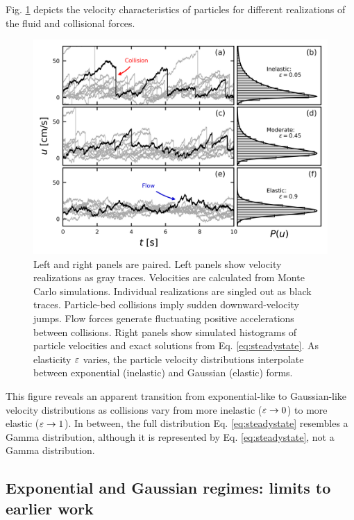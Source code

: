 Fig. \ref{fig:fig2} depicts the velocity characteristics of particles for different realizations of the fluid and collisional forces.
\begin{figure}
	\centerline{\includegraphics{./figures/ch5/Fig2pdfs.png}}
	\caption{Left and right panels are paired. Left panels show velocity realizations as gray traces. Velocities are calculated from Monte Carlo simulations. Individual realizations are singled out as black traces. Particle-bed collisions imply sudden downward-velocity jumps. Flow forces generate fluctuating positive accelerations between collisions. Right panels show simulated histograms of particle velocities and exact solutions from Eq. \ref{eq:steadystate}. As elasticity $\varepsilon$ varies, the particle velocity distributions interpolate between exponential (inelastic) and Gaussian (elastic) forms.}
	\label{fig:fig2}
\end{figure}
This figure reveals an apparent transition from exponential-like to Gaussian-like velocity distributions as collisions vary from more inelastic ($\varepsilon \rightarrow 0$) to more elastic ($\varepsilon \rightarrow 1$). In between, the full distribution Eq. \ref{eq:steadystate} resembles a Gamma distribution, although it is represented by Eq. \ref{eq:steadystate}, not a Gamma distribution.


\subsection{Exponential and Gaussian regimes: limits to earlier work}
\label{sec:langmodelcomparison}

